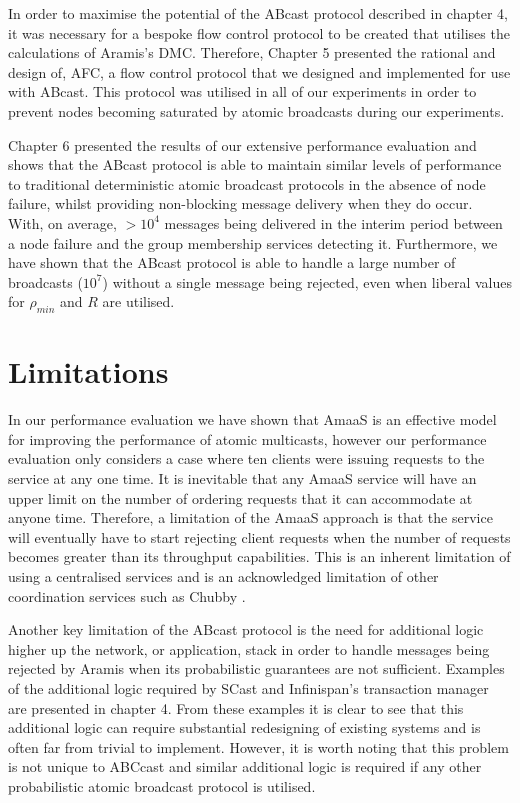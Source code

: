 In order to maximise the potential of the \textsf{ABcast} protocol described in chapter 4, it was necessary for a bespoke flow control protocol to be created that utilises the calculations of \textsf{Aramis}'s DMC.  Therefore, Chapter 5 presented the rational and design of, \textsf{AFC}, a flow control protocol that we designed and implemented for use with \textsf{ABcast}.  This protocol was utilised in all of our experiments in order to prevent nodes becoming saturated by atomic broadcasts during our experiments.  

Chapter 6 presented the results of our extensive performance evaluation and shows that the \textsf{ABcast} protocol is able to maintain similar levels of performance to traditional deterministic atomic broadcast protocols in the absence of node failure, whilst providing non-blocking message delivery when they do occur.  With, on average, $> 10^4$ messages being delivered in the interim period between a node failure and the group membership services detecting it.  Furthermore, we have shown that the \textsf{ABcast} protocol is able to handle a large number of broadcasts ($10^7$) without a single message being rejected, even when liberal values for $\rho_{min}$ and $R$ are utilised.  

\section{Limitations}\label{sec:sum_limitations}
In our performance evaluation we have shown that \textsf{AmaaS} is an effective model for improving the performance of atomic multicasts, however our performance evaluation only considers a case where ten clients were issuing requests to the service at any one time.  It is inevitable that any \textsf{AmaaS} service will have an upper limit on the number of ordering requests that it can accommodate at anyone time.  Therefore, a limitation of the \textsf{AmaaS} approach is that the service will eventually have to start rejecting client requests when the number of requests becomes greater than its throughput capabilities.  This is an inherent limitation of using a centralised services and is an acknowledged limitation of other coordination services such as Chubby \citep{Burrows:2006:CLS:1298455.1298487}.  

Another key limitation of the \textsf{ABcast} protocol is the need for additional logic higher up the network, or application, stack in order to handle messages being rejected by \textsf{Aramis} when its probabilistic guarantees are not sufficient.  Examples of the additional logic required by \textsf{SCast} and Infinispan's transaction manager are presented in chapter 4.  From these examples it is clear to see that this additional logic can require substantial redesigning of existing systems and is often far from trivial to implement.  However, it is worth noting that this problem is not unique to \textsf{ABCcast} and similar additional logic is required if any other probabilistic atomic broadcast protocol is utilised.  


